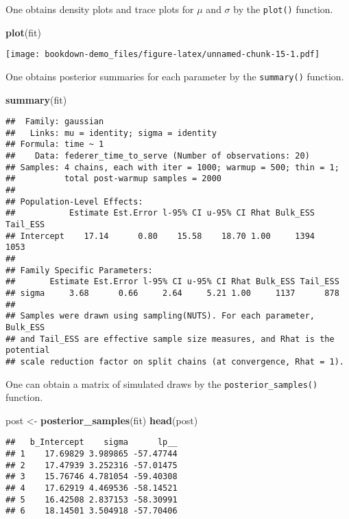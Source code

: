 \documentclass[
]{book}
\newenvironment{Shaded}{\begin{snugshade}}{\end{snugshade}}
\newcommand{\KeywordTok}[1]{\textcolor[rgb]{0.13,0.29,0.53}{\textbf{#1}}}
\newcommand{\NormalTok}[1]{#1}
\newcommand{\StringTok}[1]{\textcolor[rgb]{0.31,0.60,0.02}{#1}}
\begin{document}
One obtains density plots and trace plots for \(\mu\) and \(\sigma\) by the \texttt{plot()} function.

\begin{Shaded}
\begin{Highlighting}[]
\KeywordTok{plot}\NormalTok{(fit)}
\end{Highlighting}
\end{Shaded}

\texttt{[image: bookdown-demo\_files/figure-latex/unnamed-chunk-15-1.pdf]}

One obtains posterior summaries for each parameter by the \texttt{summary()} function.

\begin{Shaded}
\begin{Highlighting}[]
\KeywordTok{summary}\NormalTok{(fit)}
\end{Highlighting}
\end{Shaded}

\begin{verbatim}
##  Family: gaussian 
##   Links: mu = identity; sigma = identity 
## Formula: time ~ 1 
##    Data: federer_time_to_serve (Number of observations: 20) 
## Samples: 4 chains, each with iter = 1000; warmup = 500; thin = 1;
##          total post-warmup samples = 2000
## 
## Population-Level Effects: 
##           Estimate Est.Error l-95% CI u-95% CI Rhat Bulk_ESS Tail_ESS
## Intercept    17.14      0.80    15.58    18.70 1.00     1394     1053
## 
## Family Specific Parameters: 
##       Estimate Est.Error l-95% CI u-95% CI Rhat Bulk_ESS Tail_ESS
## sigma     3.68      0.66     2.64     5.21 1.00     1137      878
## 
## Samples were drawn using sampling(NUTS). For each parameter, Bulk_ESS
## and Tail_ESS are effective sample size measures, and Rhat is the potential
## scale reduction factor on split chains (at convergence, Rhat = 1).
\end{verbatim}

One can obtain a matrix of simulated draws by the \texttt{posterior\_samples()} function.

\begin{Shaded}
\begin{Highlighting}[]
\NormalTok{post <-}\StringTok{ }\KeywordTok{posterior_samples}\NormalTok{(fit)}
\KeywordTok{head}\NormalTok{(post)}
\end{Highlighting}
\end{Shaded}

\begin{verbatim}
##   b_Intercept    sigma      lp__
## 1    17.69829 3.989865 -57.47744
## 2    17.47939 3.252316 -57.01475
## 3    15.76746 4.781054 -59.40308
## 4    17.62919 4.469536 -58.14521
## 5    16.42508 2.837153 -58.30991
## 6    18.14501 3.504918 -57.70406
\end{verbatim}
\end{document}
